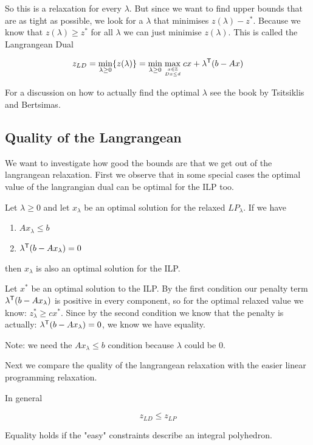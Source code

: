 So this is a relaxation for every $\lambda$. But since we want to find upper bounds that are as tight as possible, we look for a $\lambda$ that minimises $z(\lambda)-z^*$. Because we know that $z(\lambda)\geq z^*$ for all $\lambda$ we can just minimise $z(\lambda)$. This is called the Langrangean Dual

\[z_{LD} = \min_{\lambda\geq 0} \{z(\lambda)\} = \min_{\lambda\geq 0} \max_{{x\in \mathbb{Z}}\atop {Dx\leq d}} cx+{\lambda}^\text{\upshape \sffamily T}(b-Ax) \]

For a discussion on how to actually find the optimal $\lambda$ see the book by Tsitsiklis and Bertsimas.

\subsection{Quality of the Langrangean}

We want to investigate how good the bounds are that we get out of the langrangean relaxation. First we observe that in some special cases the optimal value of the langrangian dual can be optimal for the ILP too.

\begin{thm}\label{thm:relaxedOptimal} Let $\lambda \geq 0 $ and let $x_\lambda$ be an optimal solution for the relaxed $LP_\lambda$. If we have

\begin{enumerate}
\item $Ax_\lambda \leq b$
\item ${\lambda}^\text{\upshape \sffamily T}(b-Ax_\lambda) = 0$
\end{enumerate}

then $x_\lambda$ is also an optimal solution for the ILP.
\end{thm}

\begin{pr} Let $x^*$ be an optimal solution to the ILP. By the first condition our penalty term ${\lambda}^\text{\upshape \sffamily T}(b-Ax_\lambda)$ is positive in every component, so for the optimal relaxed value we know: $z_\lambda ^*\geq c x^*$. Since by the second condition we know that the penalty is actually: ${\lambda}^\text{\upshape \sffamily T}(b-Ax_\lambda) = 0$, we know we have equality.

Note: we need the $Ax_\lambda \leq b$ condition because $\lambda$ could be 0.
\end{pr}

Next we compare the quality of the langrangean relaxation with the easier linear programming relaxation.

\begin{thm} In general

\[z_{LD} \leq z_{LP}\]

Equality holds if the "easy" constraints describe an integral polyhedron.
\end{thm}

